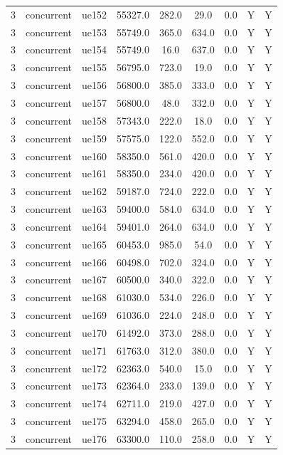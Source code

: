 \begin{table}[ht]
\begin{tabular}{|c|c|c|c|c|c|c|c|c|}
3 & concurrent & ue152 & 55327.0 & 282.0 & 29.0 & 0.0 & Y & Y \\
3 & concurrent & ue153 & 55749.0 & 365.0 & 634.0 & 0.0 & Y & Y \\
3 & concurrent & ue154 & 55749.0 & 16.0 & 637.0 & 0.0 & Y & Y \\
3 & concurrent & ue155 & 56795.0 & 723.0 & 19.0 & 0.0 & Y & Y \\
3 & concurrent & ue156 & 56800.0 & 385.0 & 333.0 & 0.0 & Y & Y \\
3 & concurrent & ue157 & 56800.0 & 48.0 & 332.0 & 0.0 & Y & Y \\
3 & concurrent & ue158 & 57343.0 & 222.0 & 18.0 & 0.0 & Y & Y \\
3 & concurrent & ue159 & 57575.0 & 122.0 & 552.0 & 0.0 & Y & Y \\
3 & concurrent & ue160 & 58350.0 & 561.0 & 420.0 & 0.0 & Y & Y \\
3 & concurrent & ue161 & 58350.0 & 234.0 & 420.0 & 0.0 & Y & Y \\
3 & concurrent & ue162 & 59187.0 & 724.0 & 222.0 & 0.0 & Y & Y \\
3 & concurrent & ue163 & 59400.0 & 584.0 & 634.0 & 0.0 & Y & Y \\
3 & concurrent & ue164 & 59401.0 & 264.0 & 634.0 & 0.0 & Y & Y \\
3 & concurrent & ue165 & 60453.0 & 985.0 & 54.0 & 0.0 & Y & Y \\
3 & concurrent & ue166 & 60498.0 & 702.0 & 324.0 & 0.0 & Y & Y \\
3 & concurrent & ue167 & 60500.0 & 340.0 & 322.0 & 0.0 & Y & Y \\
3 & concurrent & ue168 & 61030.0 & 534.0 & 226.0 & 0.0 & Y & Y \\
3 & concurrent & ue169 & 61036.0 & 224.0 & 248.0 & 0.0 & Y & Y \\
3 & concurrent & ue170 & 61492.0 & 373.0 & 288.0 & 0.0 & Y & Y \\
3 & concurrent & ue171 & 61763.0 & 312.0 & 380.0 & 0.0 & Y & Y \\
3 & concurrent & ue172 & 62363.0 & 540.0 & 15.0 & 0.0 & Y & Y \\
3 & concurrent & ue173 & 62364.0 & 233.0 & 139.0 & 0.0 & Y & Y \\
3 & concurrent & ue174 & 62711.0 & 219.0 & 427.0 & 0.0 & Y & Y \\
3 & concurrent & ue175 & 63294.0 & 458.0 & 265.0 & 0.0 & Y & Y \\
3 & concurrent & ue176 & 63300.0 & 110.0 & 258.0 & 0.0 & Y & Y \\

\end{tabular}
\end{table}
